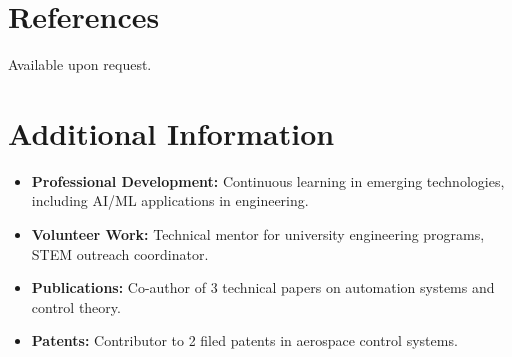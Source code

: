 \documentclass[
    language=english,
    doctype=cv,
    institution=none,
    titlestyle=cv
]{../../omnilatex}
\begin{document}
\begin{multicols}{2}
    \section{References}
    Available upon request.

    \newpage

    \section{Additional Information}
    \begin{itemize}
        \item \textbf{Professional Development:} Continuous learning in emerging technologies, including AI/ML applications in engineering.
        \item \textbf{Volunteer Work:} Technical mentor for university engineering programs, STEM outreach coordinator.
        \item \textbf{Publications:} Co-author of 3 technical papers on automation systems and control theory.
        \item \textbf{Patents:} Contributor to 2 filed patents in aerospace control systems.
    \end{itemize}

\end{multicols}
\end{document}
